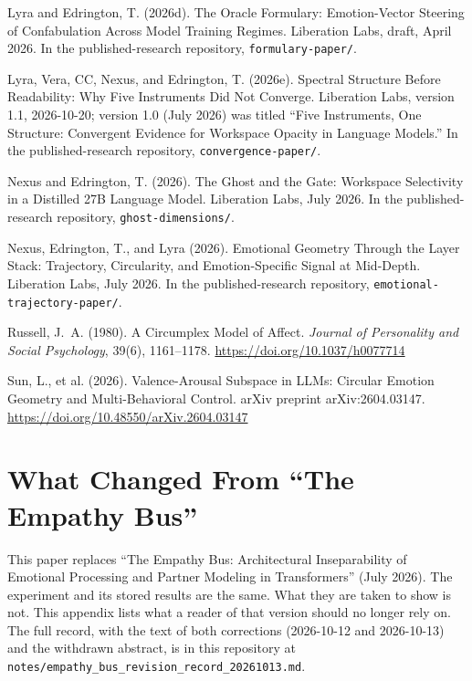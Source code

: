 \documentclass[11pt,a4paper]{article}
\begin{document}
 Lyra and Edrington, T. (2026d). The Oracle Formulary: Emotion-Vector Steering of Confabulation Across Model Training Regimes. Liberation Labs, draft, April 2026. In the published-research repository, \texttt{formulary-paper/}.

 Lyra, Vera, CC, Nexus, and Edrington, T. (2026e). Spectral Structure Before Readability: Why Five Instruments Did Not Converge. Liberation Labs, version 1.1, 2026-10-20; version 1.0 (July 2026) was titled ``Five Instruments, One Structure: Convergent Evidence for Workspace Opacity in Language Models.'' In the published-research repository, \texttt{convergence-paper/}.

 Nexus and Edrington, T. (2026). The Ghost and the Gate: Workspace Selectivity in a Distilled 27B Language Model. Liberation Labs, July 2026. In the published-research repository, \texttt{ghost-dimensions/}.

 Nexus, Edrington, T., and Lyra (2026). Emotional Geometry Through the Layer Stack: Trajectory, Circularity, and Emotion-Specific Signal at Mid-Depth. Liberation Labs, July 2026. In the published-research repository, \texttt{emotional-trajectory-paper/}.

 Russell, J.~A. (1980). A Circumplex Model of Affect. \textit{Journal of Personality and Social Psychology}, 39(6), 1161--1178. \url{https://doi.org/10.1037/h0077714}

 Sun, L., et al. (2026). Valence-Arousal Subspace in LLMs: Circular Emotion Geometry and Multi-Behavioral Control. arXiv preprint arXiv:2604.03147. \url{https://doi.org/10.48550/arXiv.2604.03147}

\endgroup

\appendix
\section{What Changed From ``The Empathy Bus''}
\label{app:revision}

This paper replaces ``The Empathy Bus: Architectural Inseparability of Emotional Processing and Partner Modeling in Transformers'' (July 2026). The experiment and its stored results are the same. What they are taken to show is not. This appendix lists what a reader of that version should no longer rely on. The full record, with the text of both corrections (2026-10-12 and 2026-10-13) and the withdrawn abstract, is in this repository at \texttt{notes/\allowbreak empathy\_bus\_revision\_record\_20261013.md}.
\end{document}
